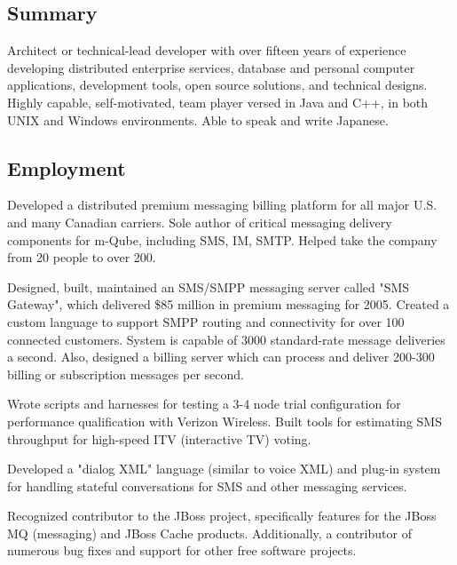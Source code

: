 \documentclass{article}
\begin{document}
\address{6742 Cleopatra PL NW - Seattle Washington 98117 - 425-466-8702 \\
http://www.noderunner.net/\%7Egenman/ - genman@noderunner.net }

\setlength{\parindent}{0pt}
\setlength{\leftskip}{0pt}
\setlength{\parskip}{8pt}

\subsection*{Summary}
Architect or technical-lead developer with over fifteen years of experience
developing distributed enterprise services, database and personal computer
applications, development tools, open source solutions, and technical designs.
Highly capable, self-motivated, team player versed in Java and C++, in both
UNIX and Windows environments.  Able to speak and write Japanese. 

\subsection*{Employment}

  
Developed a distributed premium messaging billing platform for all major U.S.
and many Canadian carriers.  Sole author of critical messaging delivery
components for m-Qube, including SMS, IM, SMTP.  Helped take the company from
20 people to over 200.
\begin{items}
\item Designed, built, maintained an SMS/SMPP messaging server called "SMS
Gateway", which delivered \$85 million in premium messaging for 2005.  Created
a custom language to support SMPP routing and connectivity for over 100
connected customers.  System is capable of 3000 standard-rate message
deliveries a second.  Also, designed a billing server which can process and
deliver 200-300 billing or subscription messages per second.
\item Wrote scripts and harnesses for testing a 3-4 node trial configuration
for performance qualification with Verizon Wireless.  Built tools for
estimating SMS throughput for high-speed ITV (interactive TV) voting.
\item Developed a "dialog XML" language (similar to voice XML) and plug-in
system for handling stateful conversations for SMS and other messaging services.
\item Recognized contributor to the JBoss project, specifically features for
the JBoss MQ (messaging) and JBoss Cache products.  Additionally, a
contributor of numerous bug fixes and support for other free software projects.
\end{items}
\end{document}
